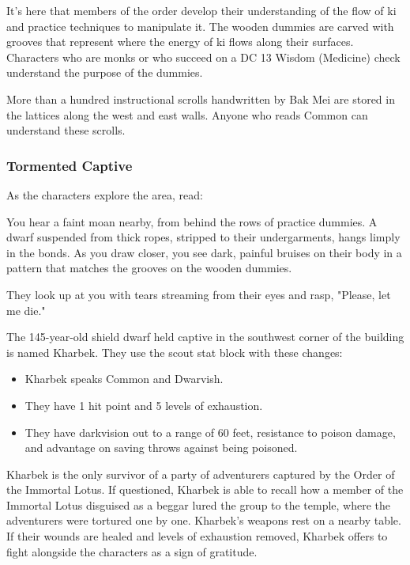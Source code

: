 \documentclass[10pt,a4paper,twoside,bg=print,twocolumn,openany,nodeprecatedcode]{dndbook}
\begin{document}
It's here that members of the order develop their understanding of the flow of ki and practice techniques to manipulate it. The wooden dummies are carved with grooves that represent where the energy of ki flows along their surfaces. Characters who are monks or who succeed on a DC 13 Wisdom (Medicine) check understand the purpose of the dummies.

More than a hundred instructional scrolls handwritten by Bak Mei are stored in the lattices along the west and east walls. Anyone who reads Common can understand these scrolls.

\subsubsection{Tormented Captive}
As the characters explore the area, read:

\begin{DndReadAloud}{}
You hear a faint moan nearby, from behind the rows of practice dummies. A dwarf suspended from thick ropes, stripped to their undergarments, hangs limply in the bonds. As you draw closer, you see dark, painful bruises on their body in a pattern that matches the grooves on the wooden dummies.

They look up at you with tears streaming from their eyes and rasp, "Please, let me die."

\end{DndReadAloud}

The 145-year-old shield dwarf held captive in the southwest corner of the building is named Kharbek. They use the scout stat block with these changes:


\begin{itemize}
\item Kharbek speaks Common and Dwarvish.
\item They have 1 hit point and 5 levels of exhaustion.
\item They have darkvision out to a range of 60 feet, resistance to poison damage, and advantage on saving throws against being poisoned.
\end{itemize}

Kharbek is the only survivor of a party of adventurers captured by the Order of the Immortal Lotus. If questioned, Kharbek is able to recall how a member of the Immortal Lotus disguised as a beggar lured the group to the temple, where the adventurers were tortured one by one. Kharbek's weapons rest on a nearby table. If their wounds are healed and levels of exhaustion removed, Kharbek offers to fight alongside the characters as a sign of gratitude.
\end{document}
